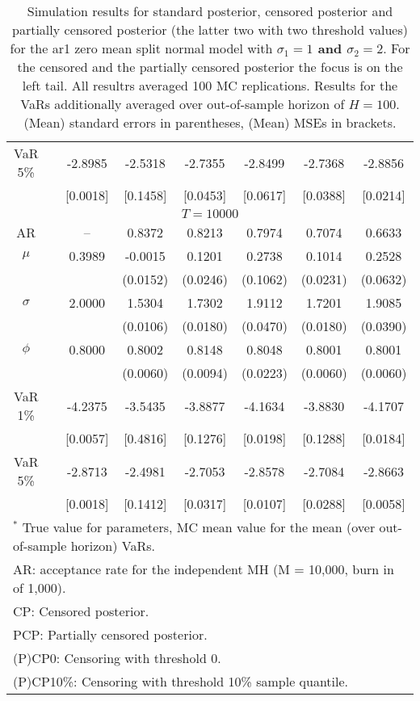 {\begin{table}
\begin{tabular}{cc cccccc}
VaR 5\% && -2.8985 & -2.5318 & -2.7355 & -2.8499 & -2.7368 & -2.8856 \\ 
 && [0.0018] & [0.1458] & [0.0453] & [0.0617] & [0.0388] & [0.0214] \\ 
\hline 
\multicolumn{8}{c}{$T =10000$}  \\ 
\hline 
AR && -- & 0.8372 & 0.8213 & 0.7974 & 0.7074 & 0.6633 \\  
$\mu$&& 0.3989 & -0.0015 & 0.1201 & 0.2738 & 0.1014 & 0.2528 \\ 
&&   & (0.0152) & (0.0246) & (0.1062) & (0.0231) & (0.0632) \\ 
$\sigma$&& 2.0000 & 1.5304 & 1.7302 & 1.9112 & 1.7201 & 1.9085 \\ 
&&   & (0.0106) & (0.0180) & (0.0470) & (0.0180) & (0.0390) \\ 
$\phi$&& 0.8000 & 0.8002 & 0.8148 & 0.8048 & 0.8001 & 0.8001 \\ 
&&   & (0.0060) & (0.0094) & (0.0223) & (0.0060) & (0.0060) \\ 
VaR 1\% && -4.2375 & -3.5435 & -3.8877 & -4.1634 & -3.8830 & -4.1707 \\ 
  && [0.0057] & [0.4816] & [0.1276] & [0.0198] & [0.1288] & [0.0184] \\ 
VaR 5\% && -2.8713 & -2.4981 & -2.7053 & -2.8578 & -2.7084 & -2.8663 \\ 
 && [0.0018] & [0.1412] & [0.0317] & [0.0107] & [0.0288] & [0.0058] \\ 
\hline 
\multicolumn{8}{l}{\footnotesize{$^*$ True value for parameters, MC mean value for the mean (over out-of-sample horizon) VaRs.}}  \\ 
\multicolumn{8}{l}{\footnotesize{AR: acceptance rate for the independent MH (M = 10,000, burn in of 1,000).}}  \\ 
\multicolumn{8}{l}{\footnotesize{CP: Censored posterior.}}  \\ 
\multicolumn{8}{l}{\footnotesize{PCP: Partially censored posterior.}} \\ 
\multicolumn{8}{l}{\footnotesize{(P)CP0: Censoring with threshold 0.}} \\ 
\multicolumn{8}{l}{\footnotesize{(P)CP10\%: Censoring with threshold 10\% sample quantile.}}  \\ 
\end{tabular}
 \caption{Simulation results for standard posterior, censored posterior and partially censored posterior (the latter two with two threshold values) for the ar1 zero mean split normal model with \textbf{$\sigma_{1} = 1$ and $\sigma_{2} = 2$}. For the censored and the partially censored posterior the focus is on the left tail. All resultrs averaged 100 MC replications. Results for the VaRs additionally averaged over out-of-sample horizon of $H=100$. (Mean) standard errors in parentheses, (Mean) MSEs in brackets.} 
\label{tab:ar1_pcp}  
\end{table}
}
